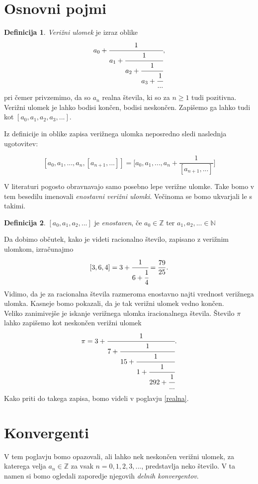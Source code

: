 \documentclass[a4paper,12pt]{article}
\newcommand{\N}{\mathbb{N}}
\newcommand{\Z}{\mathbb{Z}}
\theoremstyle{definition}
\newtheorem{df}{Definicija}[section]
\theoremstyle{proposition}
\theoremstyle{theorem}
\theoremstyle{lemma}
\begin{document}
\section{Osnovni pojmi} \label{ospojmi}

\begin{df}
	\textit{Verižni ulomek} je izraz oblike
	\[ a_0 + \cfrac{1}{a_1 + \cfrac{1}{a_2 + \cfrac{1}{a_3 + \cfrac{1}{...}}}}, \]
	pri čemer privzemimo, da so $a_n$ realna števila, ki so za $n \geq 1$ tudi pozitivna. Verižni ulomek je lahko bodisi končen, bodisi neskončen.
	\newline
	\newline
	Zapišemo ga lahko tudi kot $[a_0, a_1, a_2, a_3, ...]$.
\end{df}
	
Iz definicije in oblike zapisa verižnega ulomka neposredno sledi naslednja ugotovitev:

\begin{equation}
\label{ocitno}
[a_0, a_1, ..., a_n, [a_{n+1}, ...]]=\Bigg[ a_0, a_1, ..., a_n+\frac{1}{[a_{n+1}, ...]}\Bigg]
\end{equation}

V literaturi pogosto obravnavajo samo posebno lepe verižne ulomke. Take bomo v tem besedilu imenovali \textit{enostavni verižni ulomki}. Večinoma se bomo ukvarjali le s takimi.

\begin{df}
	$[a_0, a_1, a_2, ...]$ je \textit{enostaven}, če $a_0 \in \Z$ ter $a_1, a_2, ... \in \N$
\end{df}

Da dobimo občutek, kako je videti racionalno število, zapisano z verižnim ulomkom, izračunajmo \[ [3,6,4] = 3 + \cfrac{1}{6+\cfrac{1}{4}} = \frac{79}{25}.\]
Vidimo, da je za racionalna števila razmeroma enostavno najti vrednost verižnega ulomka. Kasneje bomo pokazali, da je tak verižni ulomek vedno končen.\\ Veliko zanimivejše je iskanje verižnega ulomka iracionalnega števila. Število $\pi$ lahko zapišemo kot neskončen verižni ulomek \[ \pi = 3 + \cfrac{1}{7 + \cfrac{1}{15 + \cfrac{1}{1 + \cfrac{1}{292 + \cfrac{1}{...}}}}}. \]
Kako priti do takega zapisa, bomo videli v poglavju \ref{realna}.

\section{Konvergenti} \label{konv}

V tem poglavju bomo opazovali, ali lahko nek neskončen verižni ulomek, za katerega velja $a_n \in \Z$ za vsak $n = 0, 1, 2, 3, ...$, predstavlja neko število. V ta namen si bomo ogledali zaporedje njegovih \textit{delnih konvergentov}.
\end{document}
